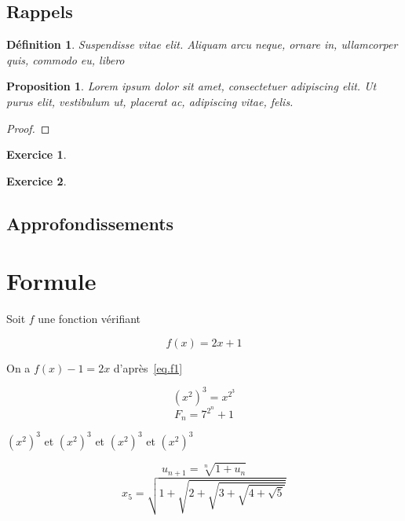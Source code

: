 \documentclass[12pt,a4paper]{scrartcl}
\theoremstyle{plain}
\newtheorem{proposition}[theoreme]{Proposition}
\newtheorem{definition}[theoreme]{Définition}
\newtheorem{exo}{Exercice}
\begin{document}
\subsection{Rappels}

\begin{definition}
Suspendisse vitae elit. Aliquam arcu neque, ornare in, ullamcorper quis, commodo eu, libero
\end{definition}

\begin{proposition}
Lorem ipsum dolor sit amet, consectetuer adipiscing elit. Ut purus
elit, vestibulum ut, placerat ac, adipiscing vitae, felis.
\end{proposition}

\begin{proof}
\lipsum[4]
\end{proof}

\begin{exo}
\lipsum[2][1-3]
\end{exo}

\begin{exo}
\lipsum[4][1-3]
\end{exo}



\subsection{Approfondissements}

\section{Formule}

Soit $f$ une fonction vérifiant

\begin{equation}
f(x)=2x+1
\end{equation}\label{eq.f1}

On a $f(x)-1=2x$ d'après~\eqref{eq.f1}

\begin{equation*}
	(x^2)^3 = x^{2^3}
\end{equation*}
\begin{equation*}
F_n = 7^{2^n}+1
\end{equation*}

$(x^2)^3$ et ${(x^2)}^3$ et $\left(x^2\right)^3$ et ${\left(x^2\right)}^3$

\begin{equation*}
	u_{n+1} = \sqrt[n]{1+u_n}
\end{equation*}
\begin{equation*}
	x_5 = \sqrt{1+\sqrt{2+\sqrt{3+\sqrt{4+\sqrt{5}}}}}
\end{equation*}
\end{document}
